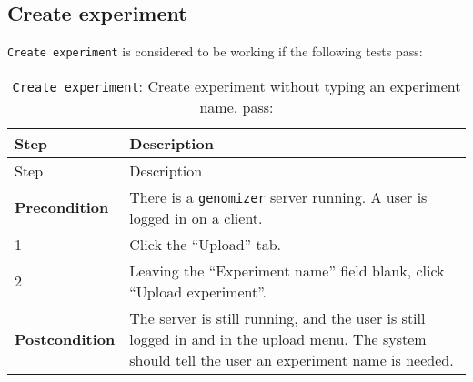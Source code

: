 \pagebreak

\subsection{Create experiment}\label{create-experiment}

\texttt{Create\ experiment} is considered to be working if the following
tests pass:

\begin{longtable}[c]{@{}ll@{}}
\caption{\texttt{Create\ experiment}: Create experiment without typing
an experiment name. pass:}\tabularnewline
\toprule
\begin{minipage}[b]{0.31\columnwidth}\raggedright\strut
Step
\strut\end{minipage} &
\begin{minipage}[b]{0.63\columnwidth}\raggedright\strut
Description
\strut\end{minipage}\tabularnewline
\midrule
\endfirsthead
\toprule
\begin{minipage}[b]{0.31\columnwidth}\raggedright\strut
Step
\strut\end{minipage} &
\begin{minipage}[b]{0.63\columnwidth}\raggedright\strut
Description
\strut\end{minipage}\tabularnewline
\midrule
\endhead
\begin{minipage}[t]{0.31\columnwidth}\raggedright\strut
\textbf{Precondition}
\strut\end{minipage} &
\begin{minipage}[t]{0.63\columnwidth}\raggedright\strut
There is a \texttt{genomizer} server running. A user is logged in on a
client.
\strut\end{minipage}\tabularnewline
\begin{minipage}[t]{0.31\columnwidth}\raggedright\strut
1
\strut\end{minipage} &
\begin{minipage}[t]{0.63\columnwidth}\raggedright\strut
Click the ``Upload'' tab.
\strut\end{minipage}\tabularnewline
\begin{minipage}[t]{0.31\columnwidth}\raggedright\strut
2
\strut\end{minipage} &
\begin{minipage}[t]{0.63\columnwidth}\raggedright\strut
Leaving the ``Experiment name'' field blank, click ``Upload
experiment''.
\strut\end{minipage}\tabularnewline
\begin{minipage}[t]{0.31\columnwidth}\raggedright\strut
\textbf{Postcondition}
\strut\end{minipage} &
\begin{minipage}[t]{0.63\columnwidth}\raggedright\strut
The server is still running, and the user is still logged in and in the
upload menu. The system should tell the user an experiment name is
needed.
\strut\end{minipage}\tabularnewline
\bottomrule
\end{longtable}

